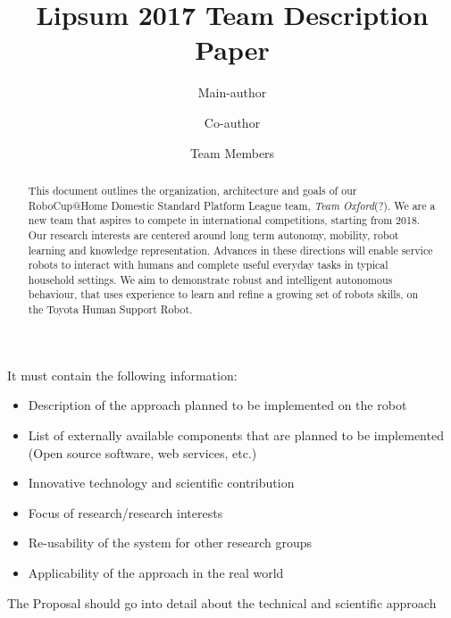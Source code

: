 \documentclass[runningheads,a4paper]{llncs}
\begin{document}
\title{Lipsum 2017 Team Description Paper}

\author{Main-author \and Co-author \and Team Members }
\maketitle



\begin{abstract}
This document outlines the organization, architecture and goals of our
RoboCup@Home Domestic Standard Platform League team, \textit{Team Oxford}(?). 
We are a new team that aspires to compete in international competitions,
starting from 2018. Our research interests are centered around long term
autonomy, mobility, robot learning and knowledge representation. 
Advances in these directions will enable service robots to interact with humans
and complete useful everyday tasks in typical household settings. 
We aim to demonstrate robust and intelligent autonomous behaviour, that uses
experience to learn and refine a growing set of robots skills, on the Toyota
Human Support Robot.

\end{abstract}



It must contain the following information:
\begin{itemize}
    \item Description of the approach planned to be implemented on the robot
    \item List of externally available components that are planned to be
    implemented (Open source software, web services, etc.)
    \item Innovative technology and scientific contribution
    \item Focus of research/research interests
    \item Re-usability of the system for other research groups
    \item Applicability of the approach in the real world
\end{itemize}
The Proposal should go into detail about the technical and scientific approach


\end{document}
